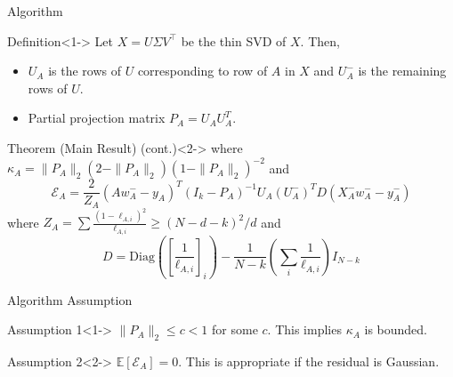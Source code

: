 \documentclass{beamer}
\newcommand{\EE}{\mathbb{E}}
\begin{document}
\begin{frame}{Algorithm}
    \begin{block}{Definition}<1->
        Let $X = U\Sigma V^\intercal$ be the thin SVD of $X$. Then, 
        \begin{itemize}
            \item $U_A$ is the rows of $U$ corresponding to row of $A$ in $X$ and $U_A^-$ is the remaining rows of $U$.
            \item Partial projection matrix $P_A = U_A U_A^T$.
        \end{itemize}
    \end{block}
     
    \begin{block}{Theorem (Main Result) (cont.)}<2->
    where    
    $
        \kappa_A = \| P_A \|_2 (2 - \| P_A \|_2) (1 - \| P_A \|_2)^{-2}
    $
        and
    \vspace{-5px}
    $$        
        \mathcal{E}_A = \frac{2}{Z_A}  (Aw_A^- - y_A)^T (I_k - P_A)^{-1} U_A (U_A^-)^T D (X_A^- w_A^- - y_A^-)
    $$
    where $Z_A = \sum \frac{(1 - \ell_{A, i} )^2}{\ell_{A, i} } \geq (N - d - k)^2 / d$ and
    \vspace{-5px}
    $$
        D = \mathrm{Diag} \left( \left[ \frac{1}{\ell_{A, i}} \right]_{i} \right) - \frac{1}{N - k}\left(\sum_i \frac{1}{\ell_{A, i} } \right) I_{N - k}
    $$
    \end{block}
\end{frame}

\begin{frame}{Algorithm Assumption}
    \begin{block} {Assumption 1}<1->
        $\| P_A \|_2 \leq c < 1$ for some $c$. This implies $\kappa_A$ is bounded.
    \end{block}
    \begin{block} {Assumption 2}<2->
        $\EE[\mathcal{E}_A] = 0.$   This is appropriate if the residual is Gaussian.
    \end{block}
\end{frame}
\end{document}
